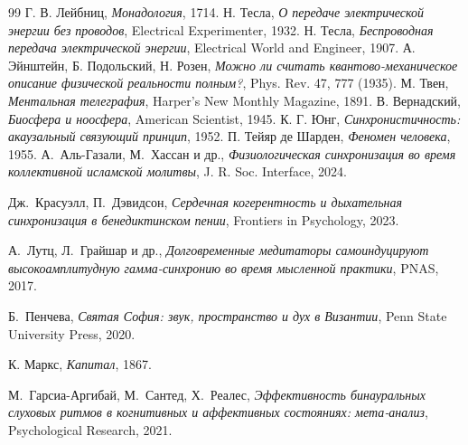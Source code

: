 \documentclass[12pt,a4paper]{article}
\begin{document}
	\begin{thebibliography}{99}
		 Г. В. Лейбниц, \emph{Монадология}, 1714.
		 Н. Тесла, \emph{О передаче электрической энергии без проводов}, Electrical Experimenter, 1932.
		 Н. Тесла, \emph{Беспроводная передача электрической энергии}, Electrical World and Engineer, 1907.
		 А. Эйнштейн, Б. Подольский, Н. Розен, \emph{Можно ли считать квантово-механическое описание физической реальности полным?}, Phys. Rev. 47, 777 (1935).
		 М. Твен, \emph{Ментальная телеграфия}, Harper's New Monthly Magazine, 1891.
		 В. Вернадский, \emph{Биосфера и ноосфера}, American Scientist, 1945.
		 К. Г. Юнг, \emph{Синхронистичность: акаузальный связующий принцип}, 1952.
		 П. Тейяр де Шарден, \emph{Феномен человека}, 1955.
		А.~Аль-Газали, М.~Хассан и др., 
		\emph{Физиологическая синхронизация во время коллективной исламской молитвы}, 
		J. R. Soc. Interface, 2024.
		
		Дж.~Красуэлл, П.~Дэвидсон, 
		\emph{Сердечная когерентность и дыхательная синхронизация в бенедиктинском пении}, 
		Frontiers in Psychology, 2023.
		
		А.~Лутц, Л.~Грайшар и др., 
		\emph{Долговременные медитаторы самоиндуцируют высокоамплитудную гамма-синхронию во время мысленной практики}, 
		PNAS, 2017.
		
		Б.~Пенчева, 
		\emph{Святая София: звук, пространство и дух в Византии}, 
		Penn State University Press, 2020.
		
		 К. Маркс, \emph{Капитал}, 1867.
		
		М.~Гарсиа-Аргибай, М.~Сантед, Х.~Реалес, 
		\emph{Эффективность бинауральных слуховых ритмов в когнитивных и аффективных состояниях: мета‑анализ}, 
		Psychological Research, 2021.
	\end{thebibliography}
	
\end{document}
